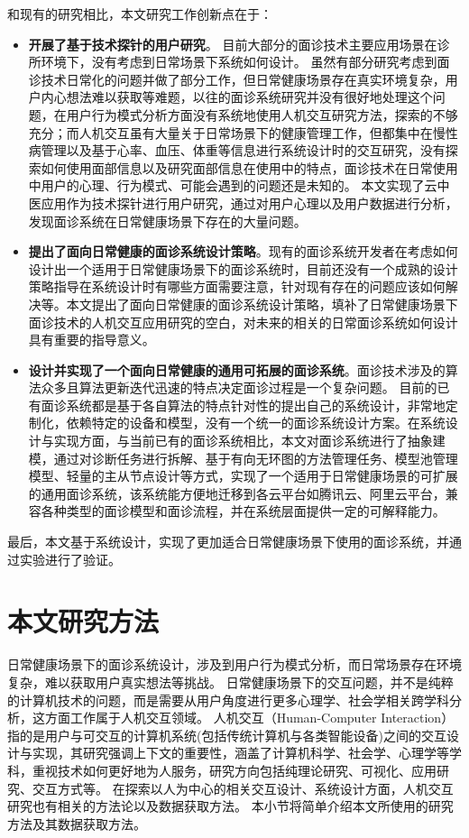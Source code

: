 和现有的研究相比，本文研究工作创新点在于：
\begin{itemize}
    \item \textbf{开展了基于技术探针的用户研究}。
    目前大部分的面诊技术主要应用场景在诊所环境下，没有考虑到日常场景下系统如何设计。
虽然有部分研究考虑到面诊技术日常化的问题并做了部分工作，但日常健康场景存在真实环境复杂，用户内心想法难以获取等难题，以往的面诊系统研究并没有很好地处理这个问题，在用户行为模式分析方面没有系统地使用人机交互研究方法，探索的不够充分；而人机交互虽有大量关于日常场景下的健康管理工作，但都集中在慢性病管理以及基于心率、血压、体重等信息进行系统设计时的交互研究，没有探索如何使用面部信息以及研究面部信息在使用中的特点，面诊技术在日常使用中用户的心理、行为模式、可能会遇到的问题还是未知的。
本文实现了云中医应用作为技术探针进行用户研究，通过对用户心理以及用户数据进行分析，发现面诊系统在日常健康场景下存在的大量问题。
    \item \textbf{提出了面向日常健康的面诊系统设计策略}。现有的面诊系统开发者在考虑如何设计出一个适用于日常健康场景下的面诊系统时，目前还没有一个成熟的设计策略指导在系统设计时有哪些方面需要注意，针对现有存在的问题应该如何解决等。本文提出了面向日常健康的面诊系统设计策略，填补了日常健康场景下面诊技术的人机交互应用研究的空白\cite{ding2019reading}，对未来的相关的日常面诊系统如何设计具有重要的指导意义。
    \item \textbf{设计并实现了一个面向日常健康的通用可拓展的面诊系统}。面诊技术涉及的算法众多且算法更新迭代迅速的特点决定面诊过程是一个复杂问题。
    目前的已有面诊系统都是基于各自算法的特点针对性的提出自己的系统设计，非常地定制化，依赖特定的设备和模型，没有一个统一的面诊系统设计方案。在系统设计与实现方面，与当前已有的面诊系统相比，本文对面诊系统进行了抽象建模，通过对诊断任务进行拆解、基于有向无环图的方法管理任务、模型池管理模型、轻量的主从节点设计等方式，实现了一个适用于日常健康场景的可扩展的通用面诊系统，该系统能方便地迁移到各云平台如腾讯云、阿里云平台，兼容各种类型的面诊模型和面诊流程，并在系统层面提供一定的可解释能力。
\end{itemize}


最后，本文基于系统设计，实现了更加适合日常健康场景下使用的面诊系统，并通过实验进行了验证。

\section{本文研究方法}
日常健康场景下的面诊系统设计，涉及到用户行为模式分析，而日常场景存在环境复杂，难以获取用户真实想法等挑战。
日常健康场景下的交互问题，并不是纯粹的计算机技术的问题，而是需要从用户角度进行更多心理学、社会学相关跨学科分析，这方面工作属于人机交互领域。
人机交互（Human-Computer Interaction）指的是用户与可交互的计算机系统(包括传统计算机与各类智能设备)之间的交互设计与实现，其研究强调上下文的重要性，涵盖了计算机科学、社会学、心理学等学科，重视技术如何更好地为人服务\cite{lazar2017research}，研究方向包括纯理论研究、可视化、应用研究、交互方式等。
在探索以人为中心的相关交互设计、系统设计方面，人机交互研究也有相关的方法论以及数据获取方法\cite{lazar2017research}。
本小节将简单介绍本文所使用的研究方法及其数据获取方法。

